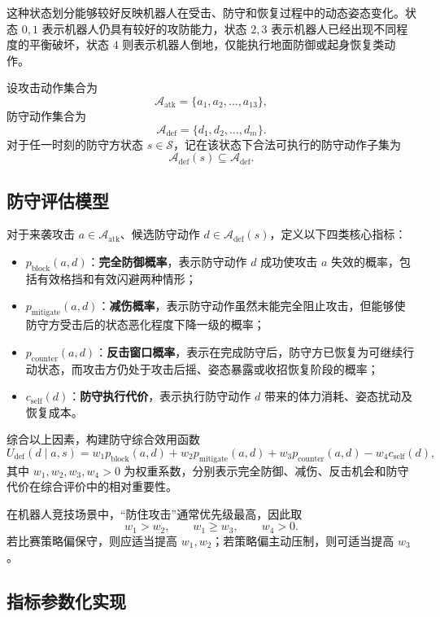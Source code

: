 这种状态划分能够较好反映机器人在受击、防守和恢复过程中的动态姿态变化。状态 \(0,1\) 表示机器人仍具有较好的攻防能力，状态 \(2,3\) 表示机器人已经出现不同程度的平衡破坏，状态 \(4\) 则表示机器人倒地，仅能执行地面防御或起身恢复类动作。

设攻击动作集合为
\[
\mathcal{A}_{\text{atk}}=\{a_1,a_2,\dots,a_{13}\},
\]
防守动作集合为
\[
\mathcal{A}_{\text{def}}=\{d_1,d_2,\dots,d_m\}.
\]
对于任一时刻的防守方状态 \(s\in\mathcal{S}\)，记在该状态下合法可执行的防守动作子集为
\[
\mathcal{A}_{\text{def}}(s)\subseteq \mathcal{A}_{\text{def}}.
\]

\subsection{防守评估模型}

对于来袭攻击 \(a\in\mathcal{A}_{\text{atk}}\)、候选防守动作 \(d\in\mathcal{A}_{\text{def}}(s)\)，定义以下四类核心指标：

\begin{itemize}
    \item \(p_{\text{block}}(a,d)\)：\textbf{完全防御概率}，表示防守动作 \(d\) 成功使攻击 \(a\) 失效的概率，包括有效格挡和有效闪避两种情形；
    \item \(p_{\text{mitigate}}(a,d)\)：\textbf{减伤概率}，表示防守动作虽然未能完全阻止攻击，但能够使防守方受击后的状态恶化程度下降一级的概率；
    \item \(p_{\text{counter}}(a,d)\)：\textbf{反击窗口概率}，表示在完成防守后，防守方已恢复为可继续行动状态，而攻击方仍处于攻击后摇、姿态暴露或收招恢复阶段的概率；
    \item \(c_{\text{self}}(d)\)：\textbf{防守执行代价}，表示执行防守动作 \(d\) 带来的体力消耗、姿态扰动及恢复成本。
\end{itemize}

综合以上因素，构建防守综合效用函数
\[
U_{\text{def}}(d\mid a,s)
=
w_1 p_{\text{block}}(a,d)
+
w_2 p_{\text{mitigate}}(a,d)
+
w_3 p_{\text{counter}}(a,d)
-
w_4 c_{\text{self}}(d),
\]
其中 \(w_1,w_2,w_3,w_4>0\) 为权重系数，分别表示完全防御、减伤、反击机会和防守代价在综合评价中的相对重要性。

在机器人竞技场景中，“防住攻击”通常优先级最高，因此取
\[
w_1>w_2,\qquad w_1\geq w_3,\qquad w_4>0.
\]
若比赛策略偏保守，则应适当提高 \(w_1,w_2\)；若策略偏主动压制，则可适当提高 \(w_3\)。

\subsection{指标参数化实现}

